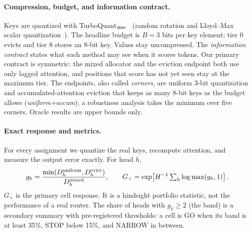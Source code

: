 \documentclass{article}
\newcommand{\gplus}{G_{+}}
\theoremstyle{definition}
\begin{document}
\paragraph{Compression, budget, and information contract.}
Keys are quantized with TurboQuant$_{\rm mse}$~\citep{zandieh2025turboquant} (random rotation and Lloyd--Max scalar quantization~\citep{lloyd1982least}).  The headline budget is $B=3$ bits per key element; tier 0 evicts and tier 8 stores an 8-bit key.  Values stay uncompressed.  The \emph{information contract} states what each method may see when it scores tokens.  Our primary contract is symmetric: the mixed allocator and the eviction endpoint both use only lagged attention, and positions that score has not yet seen stay at the maximum tier.  The endpoints, also called \emph{corners}, are uniform 3-bit quantization and accumulated-attention eviction that keeps as many 8-bit keys as the budget allows (\emph{uniform+accum}); a robustness analysis takes the minimum over five corners.  Oracle results are upper bounds only.

\paragraph{Exact response and metrics.}
For every assignment we quantize the real keys, recompute attention, and measure the output error exactly.  For head $h$,
\begin{equation}
 g_h=\frac{\min(D_h^{\rm uniform},D_h^{\rm evict})}{D_h^{\rm mixed}},
 \qquad
 \gplus=\exp\!\left[H^{-1}\textstyle\sum_h\log\max(g_h,1)\right].
 \label{eq:metrics}
\end{equation}
$\gplus$ is the primary cell response.  It is a hindsight portfolio statistic, not the performance of a real router.  The share of heads with $g_h\ge2$ (the band) is a secondary summary with pre-registered thresholds: a cell is GO when its band is at least 35\%, STOP below 15\%, and NARROW in between.
\end{document}
